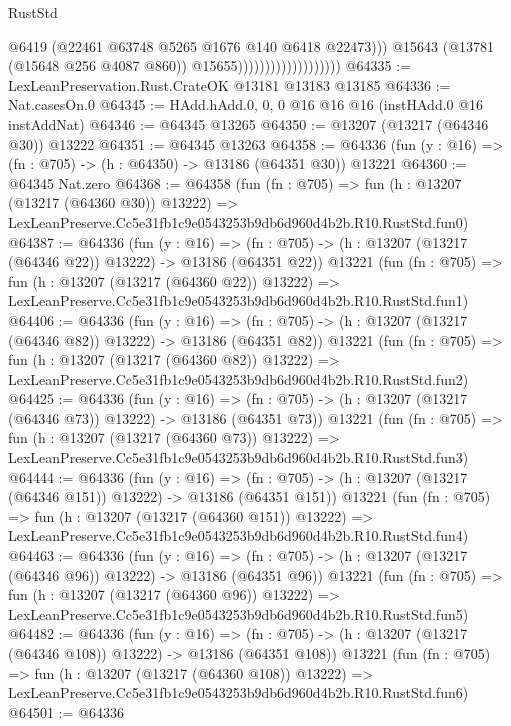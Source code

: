\begin{lexlean}{RustStd}
\begin{coremodule}
                                              @6419
                                              (@22461 @63748 @5265 @1676 @140 @6418 @22473)))
                                          @15643
                                          (@13781 (@15648 @256 @4087 @860))
                                          @15655)))))))))))))))))))
@64335 := LexLeanPreservation.Rust.CrateOK @13181 @13183 @13185
@64336 := Nat.casesOn.{0}
@64345 := HAdd.hAdd.{0, 0, 0} @16 @16 @16 (instHAdd.{0} @16 instAddNat)
@64346 := @64345 @13265
@64350 := @13207 (@13217 (@64346 @30)) @13222
@64351 := @64345 @13263
@64358 := @64336 (fun (y : @16) => (fn : @705) -> (h : @64350) -> @13186 (@64351 @30)) @13221
@64360 := @64345 Nat.zero
@64368 := @64358
    (fun (fn : @705) =>
    fun (h : @13207 (@13217 (@64360 @30)) @13222) =>
    LexLeanPreserve.Cc5e31fb1c9e0543253b9db6d960d4b2b.R10.RustStd.fun0)
@64387 := @64336
    (fun (y : @16) =>
    (fn : @705) -> (h : @13207 (@13217 (@64346 @22)) @13222) -> @13186 (@64351 @22))
    @13221
    (fun (fn : @705) =>
    fun (h : @13207 (@13217 (@64360 @22)) @13222) =>
    LexLeanPreserve.Cc5e31fb1c9e0543253b9db6d960d4b2b.R10.RustStd.fun1)
@64406 := @64336
    (fun (y : @16) =>
    (fn : @705) -> (h : @13207 (@13217 (@64346 @82)) @13222) -> @13186 (@64351 @82))
    @13221
    (fun (fn : @705) =>
    fun (h : @13207 (@13217 (@64360 @82)) @13222) =>
    LexLeanPreserve.Cc5e31fb1c9e0543253b9db6d960d4b2b.R10.RustStd.fun2)
@64425 := @64336
    (fun (y : @16) =>
    (fn : @705) -> (h : @13207 (@13217 (@64346 @73)) @13222) -> @13186 (@64351 @73))
    @13221
    (fun (fn : @705) =>
    fun (h : @13207 (@13217 (@64360 @73)) @13222) =>
    LexLeanPreserve.Cc5e31fb1c9e0543253b9db6d960d4b2b.R10.RustStd.fun3)
@64444 := @64336
    (fun (y : @16) =>
    (fn : @705) -> (h : @13207 (@13217 (@64346 @151)) @13222) -> @13186 (@64351 @151))
    @13221
    (fun (fn : @705) =>
    fun (h : @13207 (@13217 (@64360 @151)) @13222) =>
    LexLeanPreserve.Cc5e31fb1c9e0543253b9db6d960d4b2b.R10.RustStd.fun4)
@64463 := @64336
    (fun (y : @16) =>
    (fn : @705) -> (h : @13207 (@13217 (@64346 @96)) @13222) -> @13186 (@64351 @96))
    @13221
    (fun (fn : @705) =>
    fun (h : @13207 (@13217 (@64360 @96)) @13222) =>
    LexLeanPreserve.Cc5e31fb1c9e0543253b9db6d960d4b2b.R10.RustStd.fun5)
@64482 := @64336
    (fun (y : @16) =>
    (fn : @705) -> (h : @13207 (@13217 (@64346 @108)) @13222) -> @13186 (@64351 @108))
    @13221
    (fun (fn : @705) =>
    fun (h : @13207 (@13217 (@64360 @108)) @13222) =>
    LexLeanPreserve.Cc5e31fb1c9e0543253b9db6d960d4b2b.R10.RustStd.fun6)
@64501 := @64336

\end{coremodule}
\end{lexlean}
